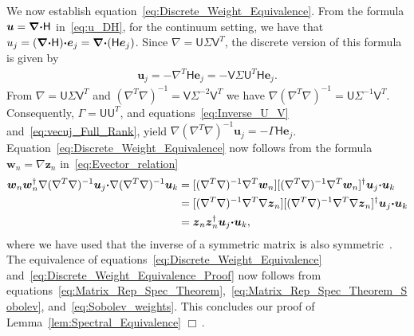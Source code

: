 \documentclass[english,12pt,jmp,graphicx]{revtex4-1}
\newcommand{\vecw}{\boldsymbol{w}}
\newcommand{\vecu}{\boldsymbol{u}}
\newcommand{\vecz}{\boldsymbol{z}}
\newcommand{\vece}{\boldsymbol{e}}
\newcommand{\lemref}[1]{Lemma~\ref{#1}}
\newcommand{\bnabla}{\mbox{\boldmath${\nabla}$}}
\newcommand{\bcdot}{\mbox{\boldmath${\cdot}$}}
\newcommand{\Hm}{\mathsf{H}}
\newcommand{\Um}{\mathsf{U}}
\newcommand{\Vm}{\mathsf{V}}
\begin{document}
We now establish
equation~\eqref{eq:Discrete_Weight_Equivalence}.
From the formula $\vecu=\bnabla\bcdot\Hm$ in~\eqref{eq:u_DH}, for the
continuum setting,  
we have that
$u_j=(\bnabla\bcdot\Hm)\bcdot\vece_j=\bnabla\bcdot(\Hm\vece_j)$. Since
$\nabla=\Um\Sigma\Vm^T$, the discrete version of this formula is given by
%
\begin{align}\label{eq:vecuj_Full_Rank}
  \vecu_j=-\nabla^T\Hm\vece_j=-\Vm\Sigma\Um^T\Hm\vece_j.
\end{align}
%
From $\nabla=\Um\Sigma\Vm^T$ and
$(\nabla^T\nabla)^{-1}=\Vm\Sigma^{-2}\Vm^T$ we have
$\nabla(\nabla^T\nabla)^{-1}=\Um\Sigma^{-1}\Vm^T$. Consequently,
$\Gamma=\Um\Um^T$, and equations~\eqref{eq:Inverse_U_V}
and~\eqref{eq:vecuj_Full_Rank}, yield     
$\nabla(\nabla^T\nabla)^{-1}\vecu_j=-\Gamma\Hm\vece_j$. Equation~\eqref{eq:Discrete_Weight_Equivalence}
now follows from the formula $\vecw_n=\nabla\vecz_n$
in~\eqref{eq:Evector_relation}
%
\begin{align}\label{eq:Discrete_Weight_Equivalence_Proof}  
  \vecw_n\vecw_n^\dagger\nabla(\nabla^T\nabla)^{-1}\vecu_j\bcdot\nabla(\nabla^T\nabla)^{-1}\vecu_k&=
  [(\nabla^T\nabla)^{-1}\nabla^T\vecw_n][(\nabla^T\nabla)^{-1}\nabla^T\vecw_n]^\dagger\vecu_j\bcdot\vecu_k
  \notag\\
  &=[(\nabla^T\nabla)^{-1}\nabla^T\nabla\vecz_n][(\nabla^T\nabla)^{-1}\nabla^T\nabla\vecz_n]^\dagger\vecu_j\bcdot\vecu_k
  \notag\\
  &=\vecz_n\vecz_n^\dagger\vecu_j\bcdot\vecu_k,
\end{align}
%
where we have used that the inverse of a symmetric matrix is also
symmetric~\cite{Horn_Johnson-1990}.
The equivalence of equations~\eqref{eq:Discrete_Weight_Equivalence}
and~\eqref{eq:Discrete_Weight_Equivalence_Proof} now follows from
equations~\eqref{eq:Matrix_Rep_Spec_Theorem},~\eqref{eq:Matrix_Rep_Spec_Theorem_Sobolev},
and~\eqref{eq:Sobolev_weights}. This concludes our proof of
\lemref{lem:Spectral_Equivalence} $\Box\,.$   
\end{document}
